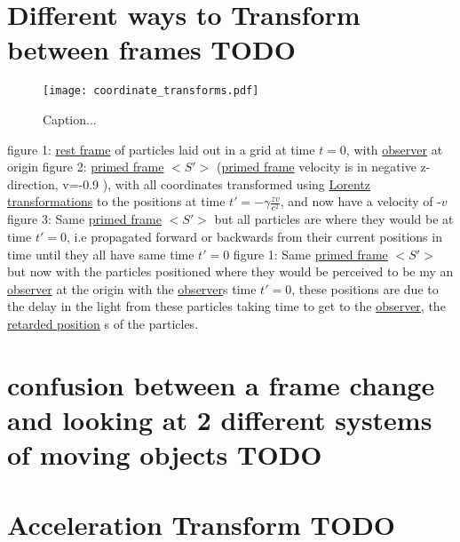 \section{Different ways to Transform between frames TODO}

\begin{figure}[ht]
\centering
       \texttt{[image: coordinate\_transforms.pdf]}
    \caption{Caption...}
    \label{fig: full coordinate transform}
\end{figure}
figure 1:
\hyperlink{def-proper-frame}{rest frame} of particles laid out in a grid at time $t=0$, with \hyperlink{def-observer}{observer} at origin
figure 2:
\hyperlink{def-Primed-Frame}{primed frame} $<S'>$ (\hyperlink{def-Primed-Frame}{primed frame} velocity is in negative z-direction, v=-0.9 ), with all coordinates transformed using \hyperlink{def-lorentz-transform}{Lorentz transformations} to the positions at time $t'=-\gamma \frac{zv}{c^2}$, and now have a velocity of -$v$  
figure 3:
Same \hyperlink{def-Primed-Frame}{primed frame} $<S'>$ but all particles are where they would be at time $t'=0$, i.e propagated forward or backwards from their current positions in time until they all have same time $t'=0$
figure 1:
Same \hyperlink{def-Primed-Frame}{primed frame} $<S'>$ but now with the particles positioned where they would be perceived to be my an \hyperlink{def-observer}{observer} at the origin with the \hyperlink{def-observer}{observer}s time $t'=0$, these positions are due to the delay in the light from these particles taking time to get to the \hyperlink{def-observer}{observer}, the \hyperlink{def-retarded-position}{retarded position} s of the particles.

\section{confusion between a frame change and looking at 2 different systems of moving objects TODO}


\section{Acceleration Transform TODO}

